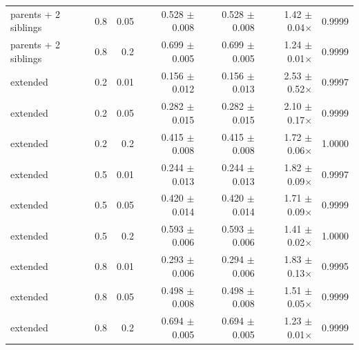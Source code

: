 \begin{tabular}{lrrrrrr}
parents + 2 siblings & 0.8 & 0.05 & 0.528 $\pm$ 0.008 & 0.528 $\pm$ 0.008 & 1.42 $\pm$ 0.04$\times$ & 0.9999 \\
parents + 2 siblings & 0.8 & 0.2 & 0.699 $\pm$ 0.005 & 0.699 $\pm$ 0.005 & 1.24 $\pm$ 0.01$\times$ & 0.9999 \\
extended & 0.2 & 0.01 & 0.156 $\pm$ 0.012 & 0.156 $\pm$ 0.013 & 2.53 $\pm$ 0.52$\times$ & 0.9997 \\
extended & 0.2 & 0.05 & 0.282 $\pm$ 0.015 & 0.282 $\pm$ 0.015 & 2.10 $\pm$ 0.17$\times$ & 0.9999 \\
extended & 0.2 & 0.2 & 0.415 $\pm$ 0.008 & 0.415 $\pm$ 0.008 & 1.72 $\pm$ 0.06$\times$ & 1.0000 \\
extended & 0.5 & 0.01 & 0.244 $\pm$ 0.013 & 0.244 $\pm$ 0.013 & 1.82 $\pm$ 0.09$\times$ & 0.9997 \\
extended & 0.5 & 0.05 & 0.420 $\pm$ 0.014 & 0.420 $\pm$ 0.014 & 1.71 $\pm$ 0.09$\times$ & 0.9999 \\
extended & 0.5 & 0.2 & 0.593 $\pm$ 0.006 & 0.593 $\pm$ 0.006 & 1.41 $\pm$ 0.02$\times$ & 1.0000 \\
extended & 0.8 & 0.01 & 0.293 $\pm$ 0.006 & 0.294 $\pm$ 0.006 & 1.83 $\pm$ 0.13$\times$ & 0.9995 \\
extended & 0.8 & 0.05 & 0.498 $\pm$ 0.008 & 0.498 $\pm$ 0.008 & 1.51 $\pm$ 0.05$\times$ & 0.9999 \\
extended & 0.8 & 0.2 & 0.694 $\pm$ 0.005 & 0.694 $\pm$ 0.005 & 1.23 $\pm$ 0.01$\times$ & 0.9999 \\
\bottomrule
\end{tabular}
